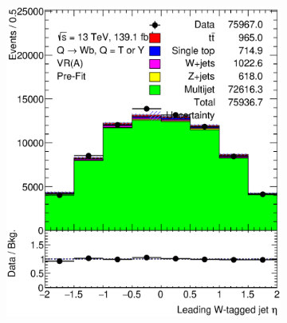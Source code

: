 \begin{figure}[hbt!]
	\centering
	\begin{subfigure}{.35\textwidth}
		\centering
		\includegraphics[width=\linewidth,height=\textheight,keepaspectratio]{figs/chapter5/prefitintegral/VR_B_ljet_eta.eps}
		\caption{}
		\label{fig:abcd:correctionfactor:integral:ljet_eta}
	\end{subfigure}\hspace{0.6cm}
	\begin{subfigure}{.35\textwidth}
		\centering

\end{subfigure}
\end{figure}
